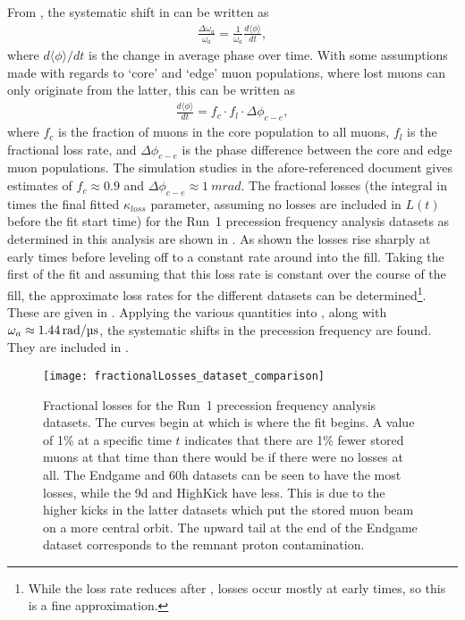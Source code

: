 From , the systematic shift in \wa can be written as
    \begin{align}
        \frac{\Delta\omega_{a}}{\omega_{a}} = \frac{1}{\omega_{a}}\frac{d\langle\phi\rangle}{dt},
    \end{align}
where $d\langle\phi\rangle/dt$ is the change in average phase over time. With some assumptions made with regards to `core' and `edge' muon populations, where lost muons can only originate from the latter, this can be written as \cite{MikeLosses}
    \begin{align} \label{eq:phaseChangeLostMuons}
        \frac{d\langle\phi\rangle}{dt} = f_{c} \cdot f_{l} \cdot \Delta\phi_{c-e},
    \end{align}
where $f_{c}$ is the fraction of muons in the core population to all muons, $f_{l}$ is the fractional loss rate, and $\Delta\phi_{c-e}$ is the phase difference between the core and edge muon populations. The simulation studies in the afore-referenced document gives estimates of $f_{c} \approx 0.9$ and $\Delta\phi_{c-e} \approx \SI{1}{mrad}$. The fractional losses (the integral in  times the final fitted $\kappa_{loss}$ parameter, assuming no losses are included in $L(t)$ before the fit start time) for the Run~1 precession frequency analysis datasets as determined in this analysis are shown in . As shown the losses rise sharply at early times before leveling off to a constant rate around  into the fill. Taking the first  of the fit and assuming that this loss rate is constant over the course of the fill, the approximate loss rates for the different datasets can be determined\footnote{While the loss rate reduces after , losses occur mostly at early times, so this is a fine approximation.}. These are given in . Applying the various quantities into , along with $\omega_{a} \approx \SI{1.44}{rad}/\SI{}{\micro s}$, the systematic shifts in the precession frequency are found. They are included in .



\begin{figure}
    \centering
    \texttt{[image: fractionalLosses\_dataset\_comparison]}
    \caption[Fractional muon losses in the analyzed Run~1 datasets]{Fractional losses for the Run~1 precession frequency analysis datasets. The curves begin at  which is where the fit begins. A value of 1\% at a specific time $t$ indicates that there are 1\% fewer stored muons at that time than there would be if there were no losses at all. The Endgame and 60h datasets can be seen to have the most losses, while the 9d and HighKick have less. This is due to the higher kicks in the latter datasets which put the stored muon beam on a more central orbit. The upward tail at the end of the Endgame dataset corresponds to the remnant proton contamination.}
    \label{fig:fractionallosses}
\end{figure}



